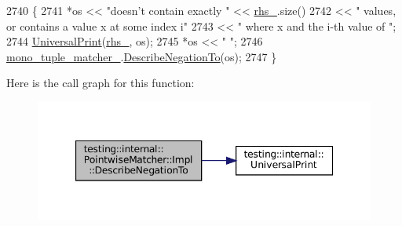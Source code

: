 \begin{DoxyCode}
2740                                                           \{
2741       *os << \textcolor{stringliteral}{"doesn't contain exactly "} << \hyperlink{classtesting_1_1internal_1_1PointwiseMatcher_1_1Impl_a7f00c6c50d20c8c274428106b6c8e9ab}{rhs\_}.size()
2742           << \textcolor{stringliteral}{" values, or contains a value x at some index i"}
2743           << \textcolor{stringliteral}{" where x and the i-th value of "};
2744       \hyperlink{namespacetesting_1_1internal_a30708fa2bacf11895b03bdb21eb72309}{UniversalPrint}(\hyperlink{classtesting_1_1internal_1_1PointwiseMatcher_1_1Impl_a7f00c6c50d20c8c274428106b6c8e9ab}{rhs\_}, os);
2745       *os << \textcolor{stringliteral}{" "};
2746       \hyperlink{classtesting_1_1internal_1_1PointwiseMatcher_1_1Impl_ac94a851d56fe3f4f900da94cdc08c973}{mono\_tuple\_matcher\_}.\hyperlink{classtesting_1_1internal_1_1MatcherBase_ac1089d49b6b8a381900618985cd69b7f}{DescribeNegationTo}(os);
2747     \}
\end{DoxyCode}
Here is the call graph for this function\+:
\nopagebreak
\begin{figure}[H]
\begin{center}
\leavevmode
\includegraphics[width=347pt]{classtesting_1_1internal_1_1PointwiseMatcher_1_1Impl_a26d3a829149e4c497aaced42aad7b247_cgraph}
\end{center}
\end{figure}
\mbox{\label{classtesting_1_1internal_1_1PointwiseMatcher_1_1Impl_a0c699f62bbd02595471b793baa9cc75e}} 

